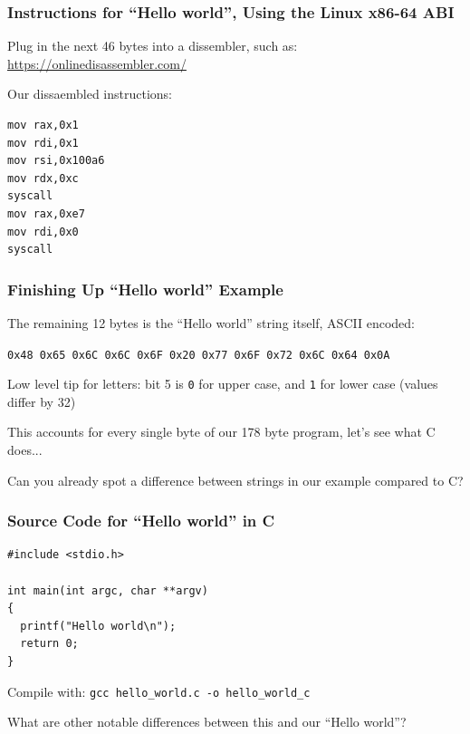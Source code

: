 \documentclass[aspectratio=169]{beamer}
\begin{document}
  \begin{frame}[fragile]
    \frametitle{Instructions for ``Hello world'', Using the Linux x86-64 ABI}

    Plug in the next 46 bytes into a dissembler, such as:
    \url{https://onlinedisassembler.com/}

    \vspace{2em}

    Our dissaembled instructions:
    \begin{lstlisting}[basicstyle=\small\ttfamily]
mov rax,0x1
mov rdi,0x1
mov rsi,0x100a6
mov rdx,0xc
syscall
mov rax,0xe7
mov rdi,0x0
syscall
    \end{lstlisting}
  \end{frame}

  \begin{frame}
    \frametitle{Finishing Up ``Hello world'' Example}

    The remaining 12 bytes is the ``Hello world'' string itself, ASCII encoded:
    
    \texttt{0x48 0x65 0x6C 0x6C 0x6F 0x20 0x77 0x6F 0x72 0x6C 0x64 0x0A}

    \vspace{1em}

    \hspace{1em} Low level tip for letters: bit 5 is \texttt{0} for upper case,
    and \texttt{1} for lower case (values differ by 32)

    \vspace{2em}

    This accounts for every single byte of our 178 byte program, let's see what
    C does...

    \vspace{2em}
    Can you already spot a difference between strings in our example compared to
    C?
  \end{frame}

  \begin{frame}[fragile]
    \frametitle{Source Code for ``Hello world'' in C}

    \begin{lstlisting}[basicstyle=\ttfamily]
#include <stdio.h>

int main(int argc, char **argv)
{
  printf("Hello world\n");
  return 0;
}
    \end{lstlisting}

    Compile with: \hspace{0.5em} \texttt{gcc hello\_world.c -o hello\_world\_c}

    \vspace{2em}

    What are other notable differences between this and our ``Hello world''?
  \end{frame}
\end{document}

